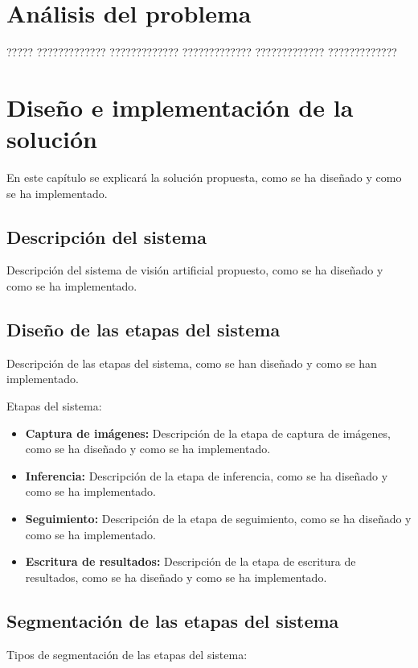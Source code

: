 \documentclass[11pt,catalan,listoffigures,listoftables]{tfgetsinf}
\begin{document}
\chapter{Análisis del problema}

????? ????????????? ????????????? ????????????? ????????????? ????????????? 

\chapter{Diseño e implementación de la solución}
En este capítulo se explicará la solución propuesta, como se ha diseñado y como se ha implementado.

\section{Descripción del sistema}

Descripción del sistema de visión artificial propuesto, como se ha diseñado y como se ha implementado.

\section{Diseño de las etapas del sistema}

Descripción de las etapas del sistema, como se han diseñado y como se han implementado.

Etapas del sistema:
\begin{itemize}
   \item \textbf{Captura de imágenes:} Descripción de la etapa de captura de imágenes, como se ha diseñado y como se ha implementado.
   \item \textbf{Inferencia:} Descripción de la etapa de inferencia, como se ha diseñado y como se ha implementado.
   \item \textbf{Seguimiento:} Descripción de la etapa de seguimiento, como se ha diseñado y como se ha implementado.
   \item \textbf{Escritura de resultados:} Descripción de la etapa de escritura de resultados, como se ha diseñado y como se ha implementado.
\end{itemize}

\section{Segmentación de las etapas del sistema}

Tipos de segmentación de las etapas del sistema:
\end{document}
